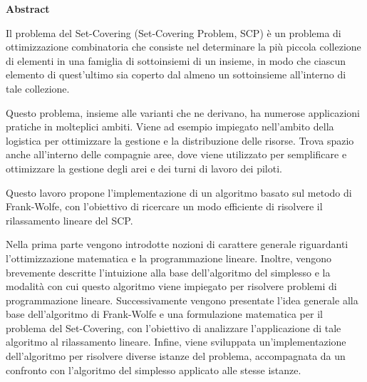 {
\thispagestyle{empty}
\vspace*{40pt}
\begin{center}
\color{primary}
\fontsize{27pt}{0pt}\bfseries\selectfont\alt Abstract
\vspace*{10pt}
\end{center}
}

\noindent
Il problema del Set-Covering (Set-Covering Problem, SCP) è un problema di ottimizzazione combinatoria che consiste nel
determinare la più piccola collezione di elementi in una famiglia di sottoinsiemi di un insieme, in modo che ciascun
elemento di quest'ultimo sia coperto dal almeno un sottoinsieme all'interno di tale collezione.

Questo problema, insieme alle varianti che ne derivano, ha numerose applicazioni pratiche in molteplici ambiti. Viene ad
esempio impiegato nell'ambito della logistica per ottimizzare la gestione e la distribuzione delle risorse. Trova spazio
anche all'interno delle compagnie aree, dove viene utilizzato per semplificare e ottimizzare la gestione degli arei e
dei turni di lavoro dei piloti.

Questo lavoro propone l'implementazione di un algoritmo basato sul metodo di Frank-Wolfe, con
l'obiettivo di ricercare un modo efficiente di risolvere il rilassamento lineare del SCP.

Nella prima parte vengono introdotte nozioni di carattere generale riguardanti l'ottimizzazione matematica e la
programmazione lineare. Inoltre, vengono brevemente descritte l'intuizione alla base dell'algoritmo del simplesso e la
modalità con cui questo algoritmo viene impiegato per risolvere problemi di programmazione lineare. Successivamente
vengono presentate l'idea generale alla base dell'algoritmo di Frank-Wolfe e una formulazione matematica per il problema
del Set-Covering, con l'obiettivo di analizzare l'applicazione di tale algoritmo al rilassamento lineare.
Infine, viene sviluppata un'implementazione dell'algoritmo per risolvere diverse istanze del problema, accompagnata da
un confronto con l'algoritmo del simplesso applicato alle stesse istanze.
